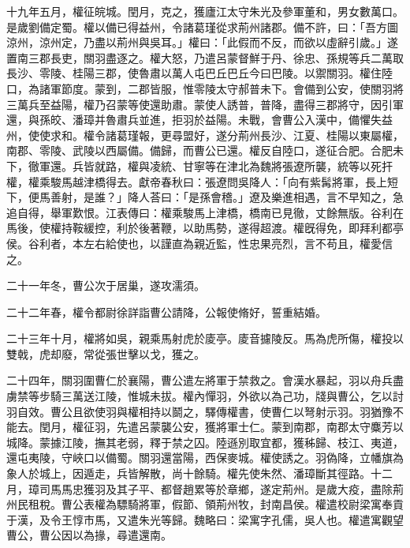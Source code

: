 \begin{pinyinscope}
十九年五月，權征皖城。閏月，克之，獲廬江太守朱光及參軍董和，男女數萬口。是歲劉備定蜀。權以備已得益州，令諸葛瑾從求荊州諸郡。備不許，曰：「吾方圖涼州，涼州定，乃盡以荊州與吳耳。」權曰：「此假而不反，而欲以虛辭引歲。」遂置南三郡長吏，關羽盡逐之。權大怒，乃遣呂蒙督鮮于丹、徐忠、孫規等兵二萬取長沙、零陵、桂陽三郡，使魯肅以萬人屯巴丘巴丘今曰巴陵。以禦關羽。權住陸口，為諸軍節度。蒙到，二郡皆服，惟零陵太守郝普未下。會備到公安，使關羽將三萬兵至益陽，權乃召蒙等使還助肅。蒙使人誘普，普降，盡得三郡將守，因引軍還，與孫皎、潘璋并魯肅兵並進，拒羽於益陽。未戰，會曹公入漢中，備懼失益州，使使求和。權令諸葛瑾報，更尋盟好，遂分荊州長沙、江夏、桂陽以東屬權，南郡、零陵、武陵以西屬備。備歸，而曹公已還。權反自陸口，遂征合肥。合肥未下，徹軍還。兵皆就路，權與凌統、甘寧等在津北為魏將張遼所襲，統等以死扞權，權乘駿馬越津橋得去。獻帝春秋曰：張遼問吳降人：「向有紫髯將軍，長上短下，便馬善射，是誰？」降人荅曰：「是孫會稽。」遼及樂進相遇，言不早知之，急追自得，舉軍歎恨。江表傳曰：權乘駿馬上津橋，橋南已見徹，丈餘無版。谷利在馬後，使權持鞍緩控，利於後著鞭，以助馬勢，遂得超渡。權旣得免，即拜利都亭侯。谷利者，本左右給使也，以謹直為親近監，性忠果亮烈，言不苟且，權愛信之。

二十一年冬，曹公次于居巢，遂攻濡須。

二十二年春，權令都尉徐詳詣曹公請降，公報使脩好，誓重結婚。

二十三年十月，權將如吳，親乘馬射虎於庱亭。庱音攄陵反。馬為虎所傷，權投以雙戟，虎却廢，常從張世擊以戈，獲之。

二十四年，關羽圍曹仁於襄陽，曹公遣左將軍于禁救之。會漢水暴起，羽以舟兵盡虜禁等步騎三萬送江陵，惟城未拔。權內憚羽，外欲以為己功，牋與曹公，乞以討羽自效。曹公且欲使羽與權相持以鬬之，驛傳權書，使曹仁以弩射示羽。羽猶豫不能去。閏月，權征羽，先遣呂蒙襲公安，獲將軍士仁。蒙到南郡，南郡太守麋芳以城降。蒙據江陵，撫其老弱，釋于禁之囚。陸遜別取宜都，獲秭歸、枝江、夷道，還屯夷陵，守峽口以備蜀。關羽還當陽，西保麥城。權使誘之。羽偽降，立幡旗為象人於城上，因遁走，兵皆解散，尚十餘騎。權先使朱然、潘璋斷其徑路。十二月，璋司馬馬忠獲羽及其子平、都督趙累等於章鄉，遂定荊州。是歲大疫，盡除荊州民租稅。曹公表權為驃騎將軍，假節、領荊州牧，封南昌侯。權遣校尉梁寓奉貢于漢，及令王惇市馬，又遣朱光等歸。魏略曰：梁寓字孔儒，吳人也。權遣寓觀望曹公，曹公因以為掾，尋遣還南。


\end{pinyinscope}
